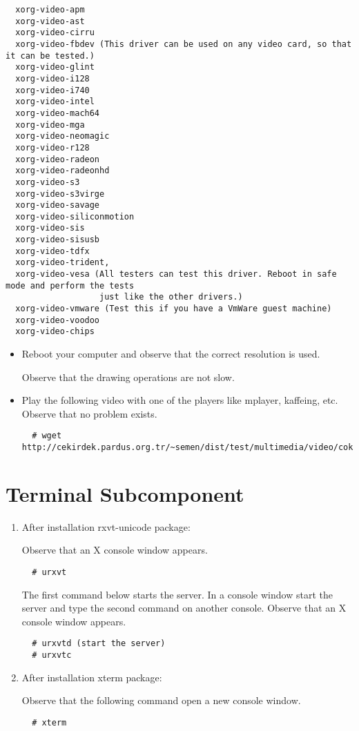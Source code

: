\documentclass[a4paper,10pt]{article}
\begin{document}
\begin{enumerate}
\begin{verbatim}
  xorg-video-apm 
  xorg-video-ast
  xorg-video-cirru
  xorg-video-fbdev (This driver can be used on any video card, so that it can be tested.)
  xorg-video-glint
  xorg-video-i128
  xorg-video-i740
  xorg-video-intel
  xorg-video-mach64
  xorg-video-mga
  xorg-video-neomagic
  xorg-video-r128
  xorg-video-radeon
  xorg-video-radeonhd
  xorg-video-s3
  xorg-video-s3virge
  xorg-video-savage
  xorg-video-siliconmotion
  xorg-video-sis
  xorg-video-sisusb
  xorg-video-tdfx
  xorg-video-trident,
  xorg-video-vesa (All testers can test this driver. Reboot in safe mode and perform the tests
                   just like the other drivers.)
  xorg-video-vmware (Test this if you have a VmWare guest machine)
  xorg-video-voodoo
  xorg-video-chips
\end{verbatim}

\begin{itemize}
  \item Reboot your computer and observe that the correct resolution is used.

  Observe that the drawing operations are not slow.
  \item Play the following video with one of the players like mplayer, kaffeing, etc. Observe that no problem exists.
  \begin{verbatim}
  # wget http://cekirdek.pardus.org.tr/~semen/dist/test/multimedia/video/cokluortam/DVD.mpg
  \end{verbatim}
\end{itemize}

\end{enumerate}

\section{Terminal Subcomponent}
\begin{enumerate}
  \item After installation  rxvt-unicode package:

  Observe that an X console window appears.
  \begin{verbatim}
  # urxvt
  \end{verbatim}

  The first command below starts the server. In a console window start the server and type the second command on another console.
Observe that an X console window appears.
  \begin{verbatim}
  # urxvtd (start the server)
  # urxvtc
  \end{verbatim}

  \item After installation  xterm package:

  Observe that the following command open a new console window.
  \begin{verbatim}
  # xterm
  \end{verbatim}
\end{enumerate}
\end{document}
